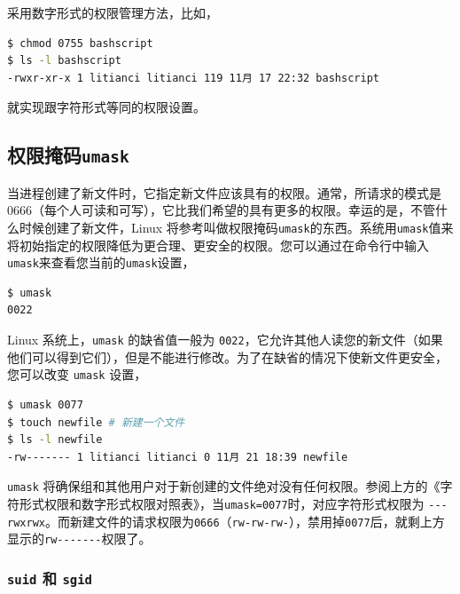 \documentclass[doctor,openright,twoside]{sjtuthesis}
\newcommand{\passthrough}[1]{#1}
\theoremstyle{plain}
\theoremstyle{definition}
\theoremstyle{remark}
\theoremstyle{ocrenumbox}
\theoremstyle{plain}
\begin{document}
采用数字形式的权限管理方法，比如，

\begin{lstlisting}[language=bash]
$ chmod 0755 bashscript
$ ls -l bashscript
-rwxr-xr-x 1 litianci litianci 119 11月 17 22:32 bashscript
\end{lstlisting}

就实现跟字符形式等同的权限设置。

\hypertarget{umask}{%
\subsection{\texorpdfstring{权限掩码\texttt{umask}}{权限掩码umask}}\label{umask}}

当进程创建了新文件时，它指定新文件应该具有的权限。通常，所请求的模式是
0666（每个人可读和可写），它比我们希望的具有更多的权限。幸运的是，不管什么时候创建了新文件，Linux
将参考叫做权限掩码\passthrough{\lstinline!umask!}的东西。系统用\passthrough{\lstinline!umask!}值来将初始指定的权限降低为更合理、更安全的权限。您可以通过在命令行中输入\passthrough{\lstinline!umask!}来查看您当前的\passthrough{\lstinline!umask!}设置，

\begin{lstlisting}[language=bash]
$ umask
0022
\end{lstlisting}

Linux 系统上，\passthrough{\lstinline!umask!} 的缺省值一般为
\passthrough{\lstinline!0022!}，它允许其他人读您的新文件（如果他们可以得到它们），但是不能进行修改。为了在缺省的情况下使新文件更安全，您可以改变
\passthrough{\lstinline!umask!} 设置，

\begin{lstlisting}[language=bash]
$ umask 0077
$ touch newfile # 新建一个文件
$ ls -l newfile
-rw------- 1 litianci litianci 0 11月 21 18:39 newfile
\end{lstlisting}

\passthrough{\lstinline!umask!}
将确保组和其他用户对于新创建的文件绝对没有任何权限。参阅上方的《字符形式权限和数字形式权限对照表》，当\passthrough{\lstinline!umask=0077!}时，对应字符形式权限为
\passthrough{\lstinline!---rwxrwx!}。而新建文件的请求权限为\passthrough{\lstinline!0666!}（\passthrough{\lstinline!rw-rw-rw-!}），禁用掉\passthrough{\lstinline!0077!}后，就剩上方显示的\passthrough{\lstinline!rw-------!}权限了。

\hypertarget{suid--sgid}{%
\subsubsection{\texorpdfstring{\texttt{suid} 和
\texttt{sgid}}{suid 和 sgid}}\label{suid--sgid}}
\end{document}
